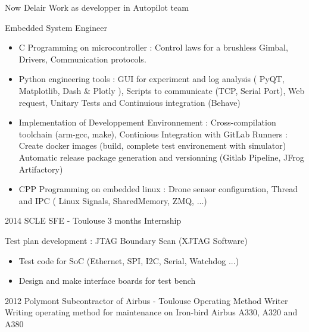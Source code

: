 \documentclass[a4paper]{friggeri-cv} %
\begin{document}
\begin{entrylist}
\entry
{Now}
{Delair}
{Work as developper in Autopilot team}
{Embedded System Engineer
\begin{itemize}
\item C Programming on microcontroller : Control laws for a brushless Gimbal, Drivers, Communication protocols.
\item Python engineering tools : GUI for experiment and log analysis ( PyQT, Matplotlib, Dash \& Plotly ), Scripts to communicate (TCP, Serial Port), Web request, Unitary Tests and Continuious integration (Behave)
\item Implementation of Developpement Environnement : Cross-compilation toolchain (arm-gcc, make), Continious Integration with GitLab Runners : Create docker images (build, complete test environement with simulator) Automatic release package generation and versionning (Gitlab Pipeline, JFrog Artifactory)
\item CPP Programming on embedded linux : Drone sensor configuration, Thread and IPC (  Linux Signals, SharedMemory, ZMQ, ...)
\end{itemize}
%
}
\entry
{2014}
{SCLE SFE - Toulouse}
{3 months Internship}
{Test plan development : JTAG Boundary Scan (XJTAG Software)
\begin{itemize}
\item Test code for SoC (Ethernet, SPI, I2C, Serial, Watchdog ...)
\item Design and make interface boards for test bench
\end{itemize}
}

\entry
{2012}
{Polymont Subcontractor of Airbus - Toulouse}
{Operating Method Writer}
{ Writing operating method for maintenance on Iron-bird Airbus A330, A320 and A380 }




\end{entrylist}
\end{document}
